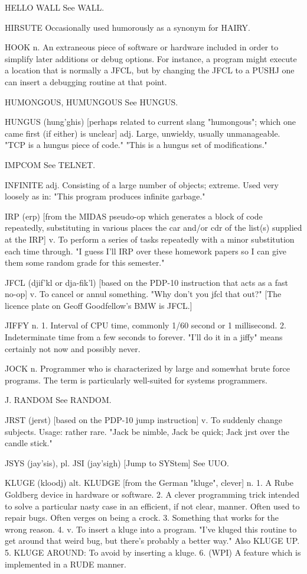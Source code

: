 HELLO WALL  See WALL.

HIRSUTE	 Occasionally used humorously as a synonym for HAIRY.

HOOK n. An extraneous piece of software or hardware included in order
   to simplify later additions or debug options.  For instance, a
   program might execute a location that is normally a JFCL, but by
   changing the JFCL to a PUSHJ one can insert a debugging routine at
   that point.

HUMONGOUS, HUMUNGOUS  See HUNGUS.

HUNGUS (hung'ghis) [perhaps related to current slang "humongous";
   which one came first (if either) is unclear] adj. Large, unwieldy,
   usually unmanageable.  "TCP is a hungus piece of code."  "This is a
   hungus set of modifications."

IMPCOM	See TELNET.

INFINITE adj. Consisting of a large number of objects; extreme.	 Used
   very loosely as in: "This program produces infinite garbage."

IRP (erp) [from the MIDAS pseudo-op which generates a block of code
   repeatedly, substituting in various places the car and/or cdr of
   the list(s) supplied at the IRP] v. To perform a series of tasks
   repeatedly with a minor substitution each time through.  "I guess
   I'll IRP over these homework papers so I can give them some random
   grade for this semester."

JFCL (djif'kl or dja-fik'l) [based on the PDP-10 instruction that acts
   as a fast no-op] v. To cancel or annul something.  "Why don't you
   jfcl that out?"  [The licence plate on Geoff Goodfellow's BMW is
   JFCL.]

JIFFY n. 1. Interval of CPU time, commonly 1/60 second or 1
   millisecond.	 2. Indeterminate time from a few seconds to forever.
   "I'll do it in a jiffy" means certainly not now and possibly never.

JOCK n. Programmer who is characterized by large and somewhat brute
   force programs.  The term is particularly well-suited for systems
   programmers.

J. RANDOM  See RANDOM.

JRST (jerst) [based on the PDP-10 jump instruction] v. To suddenly
   change subjects.  Usage: rather rare.  "Jack be nimble, Jack be
   quick; Jack jrst over the candle stick."

JSYS (jay'sis), pl. JSI (jay'sigh) [Jump to SYStem] See UUO.

KLUGE (kloodj) alt. KLUDGE [from the German "kluge", clever] n. 1. A
   Rube Goldberg device in hardware or software.  2. A clever
   programming trick intended to solve a particular nasty case in an
   efficient, if not clear, manner.  Often used to repair bugs.	 Often
   verges on being a crock.  3. Something that works for the wrong
   reason.  4. v. To insert a kluge into a program.  "I've kluged this
   routine to get around that weird bug, but there's probably a better
   way."  Also KLUGE UP.  5. KLUGE AROUND: To avoid by inserting a
   kluge.  6. (WPI) A feature which is implemented in a RUDE manner.

